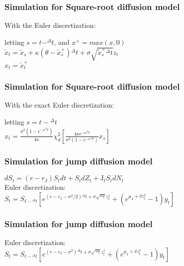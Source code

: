 \documentclass{beamer}
\begin{document}
\begin{frame}
\frametitle{Simulation for Square-root diffusion model}
With the Euler discretization:
\begin{center}
	letting $s = t-^{\Delta}t$, and $x^{+} = max(x,0)$\\[3mm]
	$\tilde{x}_{t} = \tilde{x}_{s} + \kappa(\theta-\tilde{x}_{s}^{+}){^{\Delta}t} + \sigma\sqrt{\tilde{x}_{s}^{+}{^{\Delta}t}}z_{t}$\\[3mm]
	$x_{t} = \tilde{x}_{t}^{+}$
\end{center}
\end{frame}

\begin{frame}
\frametitle{Simulation for Square-root diffusion model}
With the exact Euler discretization:
\begin{center}
	letting $s = t-{^{\Delta}t}$\\[3mm]
	$x_{t} = \frac{\sigma^{2}(1-e^{-\kappa{^{\Delta}t}})}{4\kappa}\chi_{d}^{2}[\frac{4\kappa e^{-\kappa{^{\Delta}t}}}{\sigma^{2}(1-e^{-\kappa{^{\Delta}t}})}x_{s}]$
\end{center}
\end{frame}

\begin{frame}
\frametitle{Simulation for jump diffusion model}
\begin{center}
	$dS_{t} = (r-r_{\mathrm{J}})S_{t}dt + S_{t}dZ_{t}	+ {\mathrm{J}}_{t}S_{t}dN_{t}$\\[10mm]
	Euler discretization:\\[6mm]
	$S_{t} = S_{t-{^{\Delta}t}} [e^{(r-r_{\mathrm{J}}-\sigma^{2}/2){^{\Delta}t}+\sigma \sqrt{^{\Delta}t}z_{t}^{1}}+(e^{\mu_{\mathrm{J}}+\delta z_{t}^{2}}-1)y_{t}] $
\end{center}
\end{frame}

\begin{frame}
\frametitle{Simulation for jump diffusion model}
\begin{center}
	Euler discretization:\\[3mm]
	$S_{t} = S_{t-{^{\Delta}t}} [e^{(r-r_{\mathrm{J}}-\sigma^{2}){^{\Delta}t}+\sigma \sqrt{^{\Delta}t}z_{t}^{1}}+(e^{\mu_{\mathrm{J}}+\delta z_{t}^{2}}-1)y_{t}] $
\end{center}
\end{frame}
\end{document}
